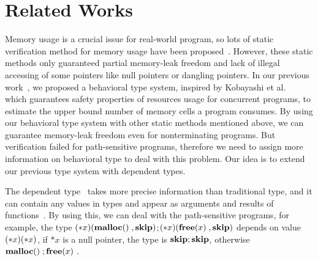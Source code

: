 \section{Related Works}\label{sec:relatedwork}

Memory usage is a crucial issue for real-world program, so lots of
static verification method for memory usage have been
proposed~\cite{DBLP:conf/aplas/SuenagaK09,DBLP:conf/pldi/HeineL03,DBLP:conf/sigsoft/XieA05,DBLP:journals/scp/SwamyHMGJ06,DBLP:conf/sas/OrlovichR06,DBLP:conf/issta/SuiYX12}. However,
these static methods only guaranteed partial memory-leak freedom and
lack of illegal accessing of some pointers like null pointers or
dangling pointers.  In our previous work~\cite{}, we proposed a
behavioral type system, inspired by Kobayashi et
al.~\cite{DBLP:journals/lmcs/KobayashiSW06} which guarantees safety
properties of resources usage for concurrent programs, to estimate the
upper bound number of memory cells a program consumes.  By using our
behavioral type system with other static methods mentioned above, we
can guarantee memory-leak freedom even for nonterminating
programs. But verification failed for path-sensitive programs,
therefore we need to assign more information on behavioral type to
deal with this problem. Our idea is to extend our previous type system
with dependent types.

The dependent type~\cite{DBLP:conf/popl/XiP99,DBLP:conf/pldi/XiP98}
takes more precise information than traditional type, and it can
contain any values in types and appear as arguments and results of
functions~\cite{DBLP:conf/tldi/Norell09}. By using this, we can deal
with the path-sensitive programs, for example, the type
\((*x)(\mathbf{malloc()}\;, \mathbf{skip})\);\((*x)(\mathbf{free}(x)\;, \mathbf{skip})\) depends on value
\((*x)(*x)\), if \(*x\) is a null pointer, the type is
\(\mathbf{skip};\mathbf{skip}\), otherwise \(\mathbf{malloc()}\;;\mathbf{free}(x)\;\).




